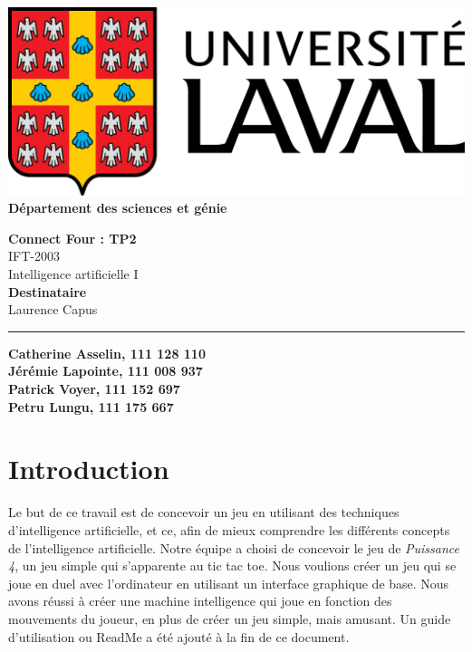 \documentclass[12pt]{article}
\begin{document}
\begin{titlepage}
	\begin{minipage}{0.5\textwidth}
		\begin{flushleft}
			\includegraphics[scale=0.1]{logo.png} \\
			\textbf{Département des sciences et génie}
		\end{flushleft}
	\end{minipage}
	\vspace{150px}
	\begin{center} \large
		\textbf{Connect Four : TP2} \\
		IFT-2003 \\
		Intelligence artificielle I \\
		\vspace{150px}
		\textbf{Destinataire} \\
		Laurence Capus
	\end{center}
	\vfill
	\rule{\linewidth}{.5pt}
	\newline
	\textbf{Catherine Asselin, 111 128 110} \\
	\textbf{Jérémie Lapointe, 111 008 937} \\
	\textbf{Patrick Voyer, 111 152 697} \\
	\textbf{Petru Lungu, 111 175 667} \\
\end{titlepage}

\newpage
\setcounter{page}{1}

\section*{Introduction}
Le but de ce travail est de concevoir un jeu en utilisant des techniques d'intelligence artificielle, et ce, afin de mieux comprendre les différents concepts de l'intelligence artificielle. Notre équipe a choisi de concevoir le jeu de \textit{Puissance 4}, un jeu simple qui s'apparente au tic tac toe. Nous voulions créer un jeu qui se joue en duel avec l'ordinateur en utilisant un interface graphique de base. Nous avons réussi à créer une machine intelligence qui joue en fonction des mouvements du joueur, en plus de créer un jeu simple, mais amusant. Un guide d'utilisation ou ReadMe a été ajouté à la fin de ce document.
\end{document}
